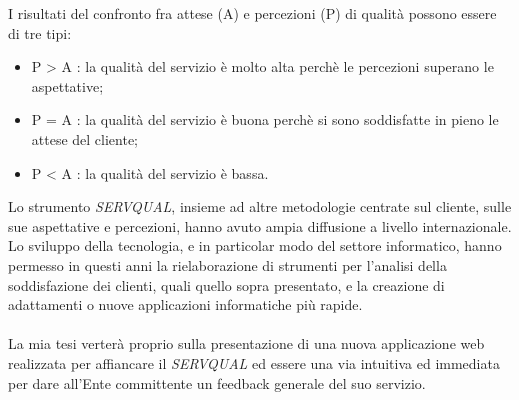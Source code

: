 I risultati del confronto fra attese (A) e percezioni (P) di qualità possono
essere di tre tipi:
\begin{itemize}
  \item P > A : la qualità del servizio è molto alta perchè le percezioni
  superano le aspettative;
  \item P = A : la qualità del servizio è buona perchè si sono soddisfatte in
  pieno le attese del cliente;
  \item P < A : la qualità del servizio è bassa. 
\end{itemize}
Lo strumento \emph{SERVQUAL}, insieme ad altre metodologie centrate sul cliente,
sulle sue aspettative e percezioni, hanno avuto ampia diffusione a livello
internazionale. Lo sviluppo della tecnologia, e in particolar modo del settore
informatico, hanno permesso in questi anni la rielaborazione di strumenti per
l’analisi della soddisfazione dei clienti, quali quello sopra presentato, e la
creazione di adattamenti o nuove applicazioni informatiche più rapide.
\\\\
La mia tesi verterà proprio sulla presentazione di una nuova applicazione web
realizzata per affiancare il \emph{SERVQUAL} ed essere una via intuitiva ed
immediata per dare all’Ente committente un feedback generale del suo servizio.




